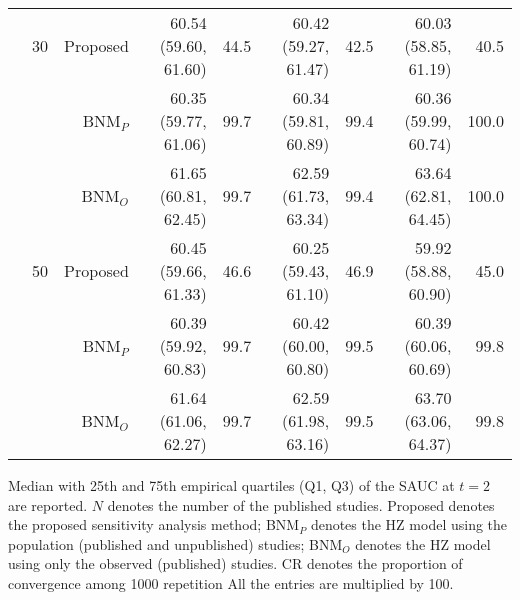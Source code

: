 \begin{table}[!htb]
\begin{threeparttable}
\begin{tabular}[t]{rrrrrrrrr}
\addlinespace
 & 30 & Proposed & 60.54 (59.60, 61.60) & 44.5 & 60.42 (59.27, 61.47) & 42.5 & 60.03 (58.85, 61.19) & 40.5\\
 &  & BNM$_P$ & 60.35 (59.77, 61.06) & 99.7 & 60.34 (59.81, 60.89) & 99.4 & 60.36 (59.99, 60.74) & 100.0\\
 &  & BNM$_O$ & 61.65 (60.81, 62.45) & 99.7 & 62.59 (61.73, 63.34) & 99.4 & 63.64 (62.81, 64.45) & 100.0\\
\addlinespace
 & 50 & Proposed & 60.45 (59.66, 61.33) & 46.6 & 60.25 (59.43, 61.10) & 46.9 & 59.92 (58.88, 60.90) & 45.0\\
 &  & BNM$_P$ & 60.39 (59.92, 60.83) & 99.7 & 60.42 (60.00, 60.80) & 99.5 & 60.39 (60.06, 60.69) & 99.8\\
 &  & BNM$_O$ & 61.64 (61.06, 62.27) & 99.7 & 62.59 (61.98, 63.16) & 99.5 & 63.70 (63.06, 64.37) & 99.8\\
\bottomrule
\end{tabular}
\begin{tablenotes}
\item 
			Median with 25th and 75th empirical quartiles (Q1, Q3) of the SAUC at $t=2$ are reported. 
			$N$ denotes the number of the published studies. 
			Proposed denotes the proposed sensitivity analysis method;
			BNM$_P$ denotes the HZ model using the population (published and unpublished) studies; 
			BNM$_O$ denotes the HZ model using only the observed (published) studies.
			CR denotes the proportion of convergence among 1000 repetition
			All the entries are multiplied by 100.
\end{tablenotes}
\end{threeparttable}
\end{table}
